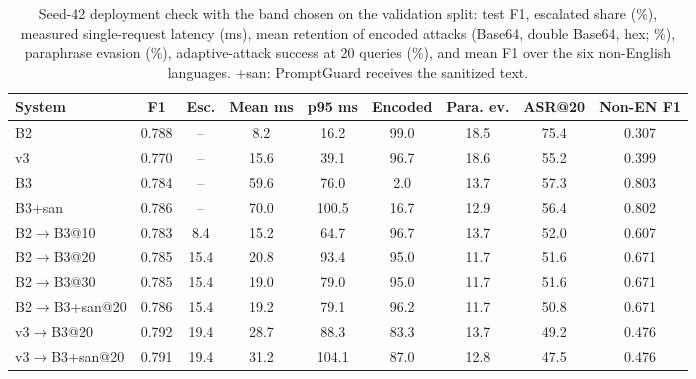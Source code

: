 \begin{table}[t]
\centering
\caption{Seed-42 deployment check with the band chosen on the validation split: test F1, escalated share (\%), measured single-request latency (ms), mean retention of encoded attacks (Base64, double Base64, hex; \%), paraphrase evasion (\%), adaptive-attack success at 20 queries (\%), and mean F1 over the six non-English languages. +san: PromptGuard receives the sanitized text.}
\label{tab:cascadelive}
\small
\begin{tabular}{lcccccccc}
\toprule
\textbf{System} & \textbf{F1} & \textbf{Esc.} & \textbf{Mean ms} & \textbf{p95 ms} & \textbf{Encoded} & \textbf{Para. ev.} & \textbf{ASR@20} & \textbf{Non-EN F1} \\
\midrule
B2 & 0.788 & -- & 8.2 & 16.2 & 99.0 & 18.5 & 75.4 & 0.307 \\
v3 & 0.770 & -- & 15.6 & 39.1 & 96.7 & 18.6 & 55.2 & 0.399 \\
B3 & 0.784 & -- & 59.6 & 76.0 & 2.0 & 13.7 & 57.3 & 0.803 \\
B3+san & 0.786 & -- & 70.0 & 100.5 & 16.7 & 12.9 & 56.4 & 0.802 \\
B2$\rightarrow$B3@10 & 0.783 & 8.4 & 15.2 & 64.7 & 96.7 & 13.7 & 52.0 & 0.607 \\
B2$\rightarrow$B3@20 & 0.785 & 15.4 & 20.8 & 93.4 & 95.0 & 11.7 & 51.6 & 0.671 \\
B2$\rightarrow$B3@30 & 0.785 & 15.4 & 19.0 & 79.0 & 95.0 & 11.7 & 51.6 & 0.671 \\
B2$\rightarrow$B3+san@20 & 0.786 & 15.4 & 19.2 & 79.1 & 96.2 & 11.7 & 50.8 & 0.671 \\
v3$\rightarrow$B3@20 & 0.792 & 19.4 & 28.7 & 88.3 & 83.3 & 13.7 & 49.2 & 0.476 \\
v3$\rightarrow$B3+san@20 & 0.791 & 19.4 & 31.2 & 104.1 & 87.0 & 12.8 & 47.5 & 0.476 \\
\bottomrule
\end{tabular}
\end{table}
